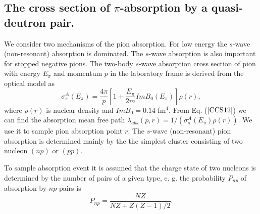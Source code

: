 \subsection{The cross section of $\pi$-absorption by a quasi-deutron pair.}

\hspace{1.0em}
We consider two mechanisms of the 
pion absorption. For low energy the $s$-wave (non-resonant) 
absorption is dominated. 
The $s$-wave absorption is also important  
  for stopped negative pions.
 The two-body $s$-wave absorption cross section of pion with energy $E_{\pi}$
and momentum $p$ in the laboratory frame is derived from the optical
model \cite{Ericson88} as 
\begin{equation}
\label{CCS12} \sigma^A_{s}(E_{\pi}) = \frac{4\pi}{p}[1 + 
\frac{E_{\pi}}{2m} Im B_0(E_{\pi})]\rho(r),
\end{equation}
where $\rho(r)$ is nuclear density and $Im B_0=0.14$ fm$^4$. From Eq.
($\ref{CCS12}$) we can find the absorption mean free path $\lambda_{abs}(p,r) 
= 1/(\sigma^A_{s}(E_{\pi})\rho(r))$. We use it to sample pion absorption point 
$r$.
The $s$-wave (non-resonant)  pion absorption is determined 
 mainly by the the simplest cluster consisting of two nucleon 
$(np)$ or $(pp)$. 

To sample absorption event  
it is assumed that the charge state of two nucleons is determined by the number 
of pairs of a given type, e. g. the probability $P_{np}$ 
of absorption by $np$-pairs is
\begin{equation}
\label{CCS13} P_{np} = \frac{NZ}{NZ+Z(Z-1)/2}.
\end{equation}







